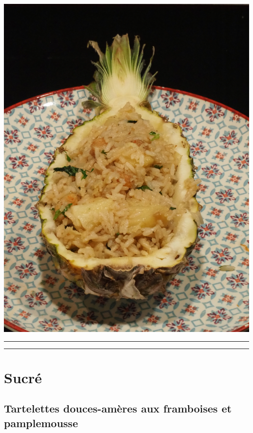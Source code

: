 \documentclass[]{book}
\begin{document}
\begin{center}\includegraphics[width=0.9\linewidth]{photos/riz_saute} \end{center}

\begin{center}\rule{0.5\linewidth}{0.5pt}\end{center}

\begin{center}\rule{0.5\linewidth}{0.5pt}\end{center}

\hypertarget{sucruxe9}{%
\section*{Sucré}\label{sucruxe9}}

\hypertarget{tartelettes-douces-amuxe8res-aux-framboises-et-pamplemousse}{%
\subsection*{\texorpdfstring{{Tartelettes douces-amères aux framboises et pamplemousse}}{Tartelettes douces-amères aux framboises et pamplemousse}}\label{tartelettes-douces-amuxe8res-aux-framboises-et-pamplemousse}}
\end{document}
